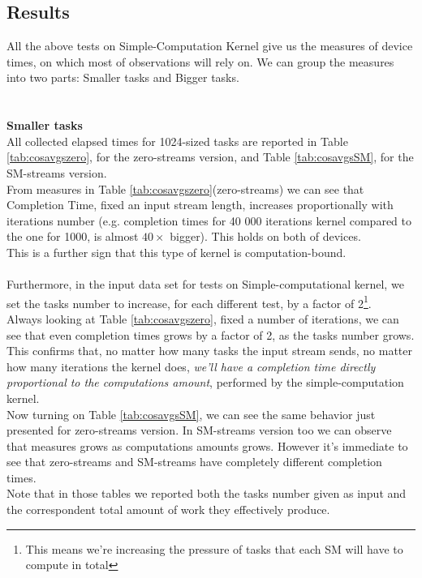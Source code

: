 \subsection{Results}
All the above tests on Simple-Computation Kernel give us the measures of device times, on which most of observations will rely on.
We can group the measures into two parts: Smaller tasks and Bigger tasks.\\\\\\
	{\large \textbf{Smaller tasks}}\\
	All collected elapsed times for 1024-sized tasks are reported in Table \ref{tab:cosavgszero}, for the zero-streams version, and Table \ref{tab:cosavgsSM}, for the SM-streams version.\\	
	From measures in Table \ref{tab:cosavgszero}(zero-streams) we can see that Completion Time, fixed an input stream length, increases proportionally with iterations number (e.g. completion times for 40 000 iterations kernel compared to the one for 1000, is almost \(40\times\) bigger). This holds on both of devices.\\
	This is a further sign that this type of kernel is computation-bound.\\\\
	Furthermore, in the input data set for tests on Simple-computational kernel, we set the tasks number to increase, for each different test, by a factor of 2\footnote{This means we're increasing the pressure of tasks that each SM will have to compute in total}.\\ 	
	Always looking at Table \ref{tab:cosavgszero}, fixed a number of iterations, we can see that even completion times grows by a factor of 2, as the tasks number grows.\\
	This confirms that, no matter how many tasks the input stream sends, no matter how many iterations the kernel does, \textit{we'll have a completion time directly proportional to the computations amount}, performed by the simple-computation kernel.\\
	
	Now turning on Table \ref{tab:cosavgsSM}, we can see the same behavior just presented for zero-streams version. In SM-streams version too we can observe that measures grows as computations amounts grows. However it's immediate to see that zero-streams and SM-streams have completely different completion times.\\
	Note that in those tables we reported both the tasks number given as input and the correspondent total amount of work they effectively produce.\\
			
